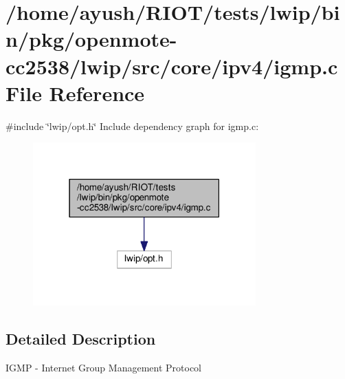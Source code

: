 \hypertarget{openmote-cc2538_2lwip_2src_2core_2ipv4_2igmp_8c}{}\section{/home/ayush/\+R\+I\+O\+T/tests/lwip/bin/pkg/openmote-\/cc2538/lwip/src/core/ipv4/igmp.c File Reference}
\label{openmote-cc2538_2lwip_2src_2core_2ipv4_2igmp_8c}
{\ttfamily \#include \char`\"{}lwip/opt.\+h\char`\"{}}\newline
Include dependency graph for igmp.\+c\+:
\nopagebreak
\begin{figure}[H]
\begin{center}
\leavevmode
\includegraphics[width=243pt]{openmote-cc2538_2lwip_2src_2core_2ipv4_2igmp_8c__incl}
\end{center}
\end{figure}


\subsection{Detailed Description}
I\+G\+MP -\/ Internet Group Management Protocol 